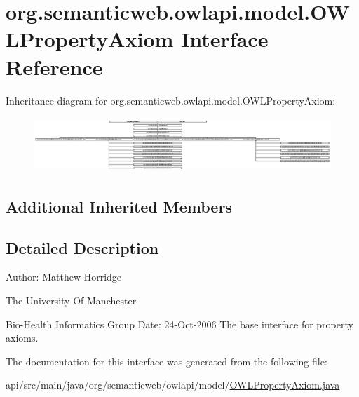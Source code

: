 \hypertarget{interfaceorg_1_1semanticweb_1_1owlapi_1_1model_1_1_o_w_l_property_axiom}{\section{org.\-semanticweb.\-owlapi.\-model.\-O\-W\-L\-Property\-Axiom Interface Reference}
\label{interfaceorg_1_1semanticweb_1_1owlapi_1_1model_1_1_o_w_l_property_axiom}
}
Inheritance diagram for org.\-semanticweb.\-owlapi.\-model.\-O\-W\-L\-Property\-Axiom\-:\begin{figure}[H]
\begin{center}
\leavevmode
\includegraphics[height=2.083998cm]{interfaceorg_1_1semanticweb_1_1owlapi_1_1model_1_1_o_w_l_property_axiom}
\end{center}
\end{figure}
\subsection*{Additional Inherited Members}


\subsection{Detailed Description}
Author\-: Matthew Horridge\par
 The University Of Manchester\par
 Bio-\/\-Health Informatics Group Date\-: 24-\/\-Oct-\/2006 The base interface for property axioms. 

The documentation for this interface was generated from the following file\-:\begin{DoxyCompactItemize}
\item 
api/src/main/java/org/semanticweb/owlapi/model/\hyperlink{_o_w_l_property_axiom_8java}{O\-W\-L\-Property\-Axiom.\-java}\end{DoxyCompactItemize}
